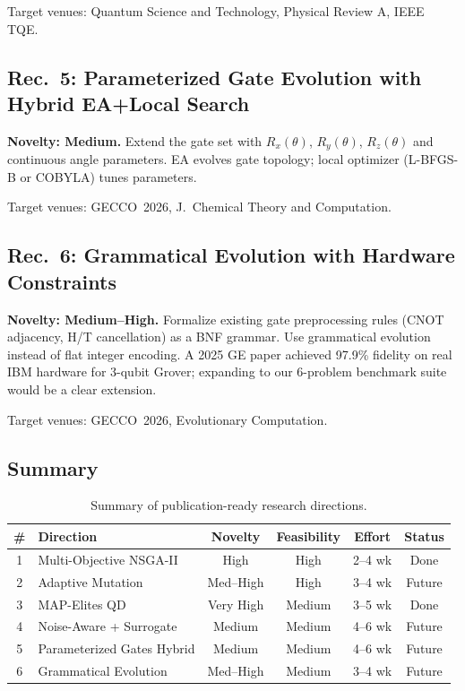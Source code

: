 \documentclass[11pt]{article}
\begin{document}
Target venues: Quantum Science and Technology, Physical Review A, IEEE TQE.

\subsection{Rec.\ 5: Parameterized Gate Evolution with Hybrid EA+Local Search} 

\textbf{Novelty: Medium.}
Extend the gate set with $R_x(\theta)$, $R_y(\theta)$, $R_z(\theta)$ and continuous angle parameters. EA evolves gate topology; local optimizer (L-BFGS-B or COBYLA) tunes parameters.

Target venues: GECCO~2026, J.~Chemical Theory and Computation.

\subsection{Rec.\ 6: Grammatical Evolution with Hardware Constraints}

\textbf{Novelty: Medium--High.}
Formalize existing gate preprocessing rules (CNOT adjacency, H/T cancellation) as a BNF grammar. Use grammatical evolution instead of flat integer encoding. A 2025 GE paper achieved 97.9\% fidelity on real IBM hardware for 3-qubit Grover; expanding to our 6-problem benchmark suite would be a clear extension.

Target venues: GECCO~2026, Evolutionary Computation.

\subsection{Summary}

\begin{table}[h]
\centering
\begin{tabular}{clcccc}
\toprule
\textbf{\#} & \textbf{Direction} & \textbf{Novelty} & \textbf{Feasibility} & \textbf{Effort} & \textbf{Status} \\
\midrule
1 & Multi-Objective NSGA-II & High & High & 2--4 wk & Done \\
2 & Adaptive Mutation & Med--High & High & 3--4 wk & Future \\
3 & MAP-Elites QD & Very High & Medium & 3--5 wk & Done \\
4 & Noise-Aware + Surrogate & Medium & Medium & 4--6 wk & Future \\
5 & Parameterized Gates Hybrid & Medium & Medium & 4--6 wk & Future \\
6 & Grammatical Evolution & Med--High & Medium & 3--4 wk & Future \\
\bottomrule
\end{tabular}
\caption{Summary of publication-ready research directions.}
\label{tab:recommendations}
\end{table}
\end{document}
